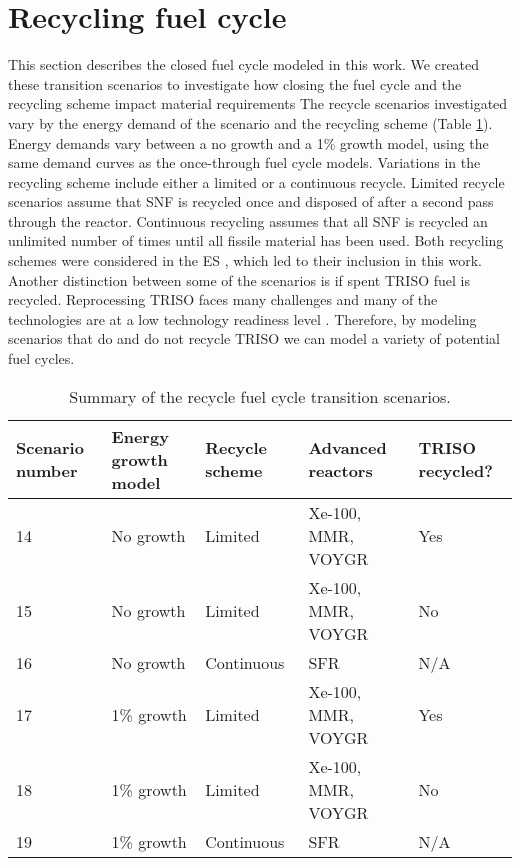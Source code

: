 \section{Recycling fuel cycle}\label{sec:recycle-methods}
This section describes the closed fuel cycle modeled in this work. 
We created these transition scenarios to investigate how closing 
the fuel cycle and the recycling scheme impact material 
requirements The recycle scenarios investigated  
vary by the energy demand of the scenario and the recycling 
scheme (Table \ref{tab:scenarios_recycle}). Energy demands vary 
between a no growth and a 1\% growth model, using the same 
demand curves as the once-through 
fuel cycle models. Variations in the recycling 
scheme include either a limited or a continuous recycle. Limited recycle 
scenarios assume that \gls{SNF} is recycled once and disposed of after a 
second pass through the reactor. Continuous recycling assumes that all 
\gls{SNF} is recycled an unlimited number of times until all fissile 
material has been used. Both recycling schemes were considered in the 
\acrfull{ES} \cite{wigeland_nuclear_2014}, which led to their inclusion 
in this work. Another distinction between some of the 
scenarios is if spent \gls{TRISO} fuel is recycled. Reprocessing \gls{TRISO}
faces many challenges and many of the technologies are at a low technology 
readiness level \cite{arm_plan_2022,kiegiel_management_2022}.
Therefore, by modeling scenarios that do and do not recycle 
\gls{TRISO} we can model a variety of potential fuel cycles. 

\begin{table}[ht]
    \centering
    \caption{Summary of the recycle fuel cycle transition scenarios.}
    \label{tab:scenarios_recycle}
    \begin{tabular}{l l l l l}
            \hline
            Scenario number & Energy growth model & Recycle scheme &
            Advanced reactors & \gls{TRISO} recycled?\\
            \hline
            14 & No growth & Limited & Xe-100, MMR, VOYGR & Yes\\
            15 & No growth & Limited & Xe-100, MMR, VOYGR & No\\
            16 & No growth & Continuous & SFR & N/A \\
            17 & 1\% growth & Limited & Xe-100, MMR, VOYGR & Yes\\
            18 & 1\% growth & Limited & Xe-100, MMR, VOYGR & No\\
            19 & 1\% growth & Continuous & SFR & N/A \\
            \hline
    \end{tabular}
\end{table}

